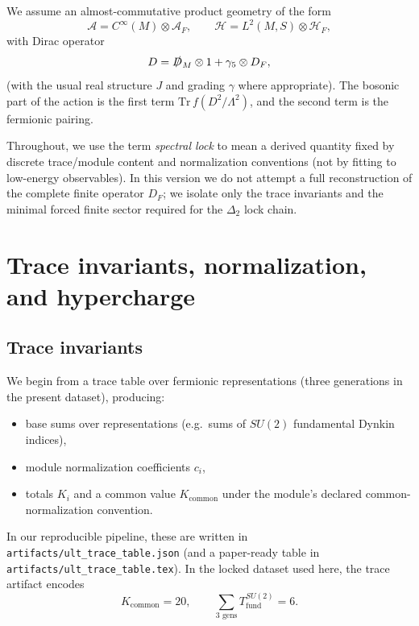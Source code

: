 \documentclass[11pt]{article}
\begin{document}
We assume an almost-commutative product geometry of the form
\begin{equation}
\mathcal{A} = C^\infty(M)\otimes \mathcal{A}_F,\qquad
\mathcal{H} = L^2(M,S)\otimes \mathcal{H}_F,
\end{equation}
with Dirac operator
\begin{equation}
D = \slashed{D}_M\otimes 1 + \gamma_5 \otimes D_F,
\end{equation}
(with the usual real structure $J$ and grading $\gamma$ where appropriate). The bosonic part of the action is the first term $\mathrm{Tr}\, f(D^2/\Lambda^2)$, and the second term is the fermionic pairing.

Throughout, we use the term \emph{spectral lock} to mean a derived quantity fixed by discrete trace/module content and normalization conventions (not by fitting to low-energy observables). In this version we do not attempt a full reconstruction of the complete finite operator $D_F$; we isolate only the trace invariants and the minimal forced finite sector required for the $\Delta_2$ lock chain.

\section{Trace invariants, normalization, and hypercharge}
\subsection{Trace invariants}
We begin from a trace table over fermionic representations (three generations in the present dataset), producing:
\begin{itemize}
  \item base sums over representations (e.g.\ sums of $SU(2)$ fundamental Dynkin indices),
  \item module normalization coefficients $c_i$,
  \item totals $K_i$ and a common value $K_{\mathrm{common}}$ under the module’s declared common-normalization convention.
\end{itemize}
In our reproducible pipeline, these are written in \texttt{artifacts/ult\_trace\_table.json} (and a paper-ready table in \texttt{artifacts/ult\_trace\_table.tex}). In the locked dataset used here, the trace artifact encodes
\begin{equation}
K_{\mathrm{common}} = 20,\qquad \sum_{\text{3 gens}} T_{\mathrm{fund}}^{SU(2)} = 6.
\end{equation}
\end{document}
